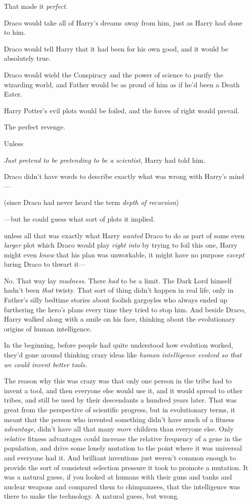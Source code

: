 That made it \emph{perfect.}

Draco would take all of Harry's dreams away from him, just as Harry had done to
him.

Draco would tell Harry that it had been for his own good, and it would be
absolutely true.

Draco would wield the Conspiracy and the power of science to purify the
wizarding world, and Father would be as proud of him as if he'd been a Death
Eater.

Harry Potter's evil plots would be foiled, and the forces of right would
prevail.

The perfect revenge.

Unless{\el}

\emph{Just pretend to be pretending to be a scientist,} Harry had told him.

Draco didn't have words to describe exactly what was wrong with Harry's mind\mbox{---}

(since Draco had never heard the term \emph{depth of recursion})

---but he could guess what sort of plots it implied.

{\el} unless all that was exactly what Harry \emph{wanted} Draco to do as
part of some even \emph{larger} plot which Draco would play \emph{right into}
by trying to foil this one, Harry might even \emph{know} that his plan was
unworkable, it might have no purpose \emph{except} luring Draco to thwart it\mbox{---}

No. That way lay \emph{madness.} There \emph{had} to be a limit. The Dark Lord
himself hadn't been \emph{that} twisty. That sort of thing didn't happen in
real life, only in Father's silly bedtime stories about foolish gargoyles who
always ended up furthering the hero's plans every time they tried to stop him.
\sbreak
And beside Draco, Harry walked along with a smile on his face, thinking about
the evolutionary origins of human intelligence.

In the beginning, before people had quite understood how evolution worked,
they'd gone around thinking crazy ideas like \emph{human intelligence evolved
so that we could invent better tools.}

The reason why this was crazy was that only one person in the tribe had to
invent a tool, and then everyone else would use it, and it would spread to
other tribes, and still be used by their descendants a hundred years later.
That was great from the perspective of scientific progress, but in evolutionary
terms, it meant that the person who invented something didn't have much of a
fitness \emph{advantage}, didn't have all that many \emph{more} children than
everyone else. Only \emph{relative} fitness advantages could increase the
relative frequency of a gene in the population, and drive some lonely mutation
to the point where it was universal and everyone had it. And brilliant
inventions just weren't common enough to provide the sort of consistent
selection pressure it took to promote a mutation. It was a natural guess, if
you looked at humans with their guns and tanks and nuclear weapons and compared
them to chimpanzees, that the intelligence was there to make the technology. A
natural guess, but wrong.

